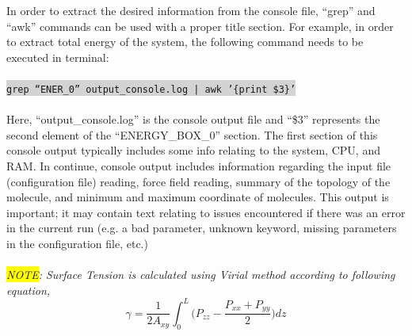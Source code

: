 \newline
\newline
In order to extract the desired information from the console file, ``grep'' and ``awk'' commands can be used with a proper title section. For example, in order to extract total energy of the system, the following command needs to be executed in terminal:\\\\
\colorbox{lightgray}{
\texttt{grep ``ENER\_0''   output\_console.log | awk '\{{print \$3}\}'}
}\\\\
Here, ``output\_console.log'' is the console output file and ``\$3'' represents the second element of the ``ENERGY\_BOX\_0'' section.
The first section of this console output typically includes some info relating to the system, CPU, and RAM. In continue, console output includes information regarding the input file (configuration file) reading, force field reading, summary of the topology of the molecule, and minimum and maximum coordinate of molecules. This output is important; it may contain text relating to issues encountered if there was an error in the current run (e.g. a bad parameter, unknown keyword, missing parameters in the configuration file, etc.)\\\\
\textit{\colorbox{yellow}{NOTE}: Surface Tension is calculated using Virial method according to following equation,}
\begin{equation}
	\gamma = \frac{1}{2A_{xy}} \int_{0}^{L} \bigg(P_{zz} - \frac{P_{xx} + P_{yy}}{2} \bigg) dz
\end{equation}


